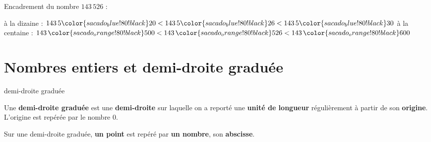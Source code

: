 \begin{pageCours}
\begin{Ex}
Encadrement du nombre $143\,526$ :

à la {\color{sacado_blue}dizaine} : \(143\,5{\color{sacado_blue!80!black}2}0 < 143\,5{\color{sacado_blue!80!black}2}6 < 143\,5{\color{sacado_blue!80!black}3}0\) \quad à la {\color{sacado_orange!80!black}centaine} : \(143\,{\color{sacado_orange!80!black}5}00 < 143\,{\color{sacado_orange!80!black}5}26 < 143\,{\color{sacado_orange!80!black}6}00\)
\end{Ex}
 


\section{Nombres entiers et demi-droite graduée}

\begin{DefT}{demi-droite graduée}

Une \textbf{demi-droite graduée} est une \textbf{demi-droite} sur laquelle on a reporté une \textbf{unité de longueur} régulièrement à partir de son \textbf{origine}. L'origine est repérée par le nombre $0$.

Sur une demi-droite graduée, \textbf{un point} est repéré par \textbf{un nombre}, son \textbf{abscisse}.


\begin{center}
\end{center}

\end{DefT}

\end{pageCours} 

